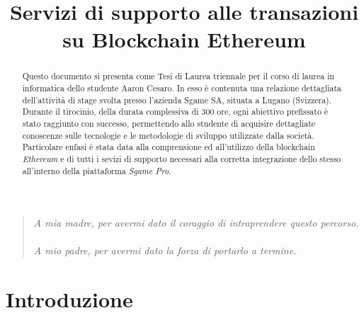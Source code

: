 \documentclass[11pt]{thesistemp}
\title{Servizi di supporto alle transazioni su Blockchain Ethereum}
\begin{document}
\maketitle
\leavevmode\thispagestyle{empty}\newpage
\leavevmode\thispagestyle{empty}\newpage
\begin{quote}
	\textit{A mia madre, per avermi dato il coraggio di intraprendere questo percorso.\\\\
	A mio padre, per avermi dato la forza di portarlo a termine.}
\end{quote}
\leavevmode\thispagestyle{empty}\newpage
\leavevmode\thispagestyle{empty}\newpage
\leavevmode\thispagestyle{empty}\newpage
\begin{abstract}
Questo documento si presenta come Tesi di Laurea triennale per il corso di laurea in informatica dello studente Aaron Cesaro. In esso \`e contenuta una relazione dettagliata dell’attivit\`a di stage svolta presso l’azienda Sgame SA, situata a Lugano (Svizzera). Durante il tirocinio, della durata complessiva di 300 ore, ogni abiettivo prefissato \`e stato raggiunto con successo, permettendo allo studente di acquisire dettagliate conoscenze sulle tecnologie e le metodologie di sviluppo utilizzate dalla società.
Particolare enfasi è stata data alla comprensione ed all'utilizzo della blockchain \textit{Ethereum} e di tutti i sevizi di supporto necessari alla corretta integrazione dello stesso all'interno della piattaforma \textit{Sgame Pro}.
\end{abstract}

\tableofcontents


\section{Introduzione}
\end{document}
